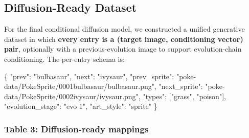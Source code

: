 \documentclass[
]{article}
\newenvironment{Shaded}{}{}
\newcommand{\DataTypeTok}[1]{\textcolor[rgb]{0.56,0.13,0.00}{#1}}
\newcommand{\FunctionTok}[1]{\textcolor[rgb]{0.02,0.16,0.49}{#1}}
\newcommand{\OtherTok}[1]{\textcolor[rgb]{0.00,0.44,0.13}{#1}}
\newcommand{\StringTok}[1]{\textcolor[rgb]{0.25,0.44,0.63}{#1}}
\begin{document}
\subsection{Diffusion-Ready Dataset
}\label{diffusion-ready-dataset-final}

For the final conditional diffusion model, we constructed a unified
generative dataset in which \textbf{every entry is a (target image,
conditioning vector) pair}, optionally with a previous-evolution image
to support evolution-chain conditioning. The per-entry schema is:

\begin{Shaded}
\begin{Highlighting}[]
\FunctionTok{\{}
  \DataTypeTok{"prev"}\FunctionTok{:} \StringTok{"bulbasaur"}\FunctionTok{,} \DataTypeTok{"next"}\FunctionTok{:} \StringTok{"ivysaur"}\FunctionTok{,}
  \DataTypeTok{"prev\_sprite"}\FunctionTok{:} \StringTok{"poke{-}data/PokeSprite/0001bulbasaur/bulbasaur.png"}\FunctionTok{,}
  \DataTypeTok{"next\_sprite"}\FunctionTok{:} \StringTok{"poke{-}data/PokeSprite/0002ivysaur/ivysaur.png"}\FunctionTok{,}
  \DataTypeTok{"types"}\FunctionTok{:} \OtherTok{[}\StringTok{"grass"}\OtherTok{,} \StringTok{"poison"}\OtherTok{]}\FunctionTok{,}
  \DataTypeTok{"evolution\_stage"}\FunctionTok{:} \StringTok{"evo 1"}\FunctionTok{,}
  \DataTypeTok{"art\_style"}\FunctionTok{:} \StringTok{"sprite"}
\FunctionTok{\}}
\end{Highlighting}
\end{Shaded}

\subsubsection{Table 3: Diffusion-ready
mappings}\label{table-3.-diffusion-ready-mappings}
\end{document}
